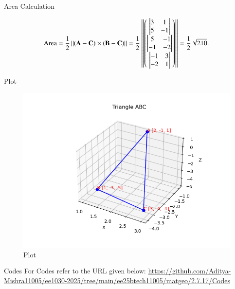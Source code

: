 \documentclass{beamer}
\begin{document}
\begin{frame}{Area Calculation}
\begin{center}
\[
\text{Area} = \frac{1}{2} \left\| (\mathbf{A} - \mathbf{C}) \times (\mathbf{B} - \mathbf{C}) \right\| 
= \frac{1}{2} \left\|
\begin{pmatrix}
\left|
\begin{matrix}
3 & 1 \\
5 & -1
\end{matrix}
\right|
\\
\left|
\begin{matrix}
5 & -1 \\
-1 & -2
\end{matrix}
\right|
\\
\left|
\begin{matrix}
-1 & 3 \\
-2 & 1
\end{matrix}
\right|
\end{pmatrix}
\right\| 
= \frac{1}{2} \sqrt{210}.
\]
\end{center}

\end{frame}
\begin{frame}{Plot}
\begin{figure}
    \centering
    \includegraphics[width=0.8\columnwidth]{Figs/Figure_1.png}
    \caption{Plot}
    \label{fig:placeholder}
\end{figure}
\end{frame}
\begin{frame}{Codes}
	\centering
	For Codes refer to the URL given below:
	\url{https://github.com/Aditya-Mishra11005/ee1030-2025/tree/main/ee25btech11005/matgeo/2.7.17/Codes}
\end{frame}
\end{document}
